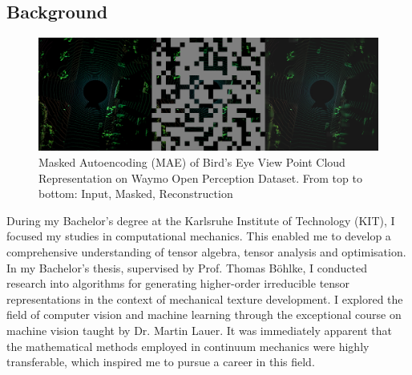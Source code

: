


\setlength{\columnsep}{15pt}%
\setlength{\intextsep}{0pt plus 0pt minus 0pt}


\setlength{\parindent}{\myindent}

    
    \subsection{\textbf{Background}} \begin{figure}
        \includegraphics[width=330pt, angle=270]{pic/Hiera-Waymo.png}
        \mainfont\fontsize{9pt}{9pt}\selectfont\caption{ \mainfont\fontsize{9pt}{9pt}\selectfont Masked Autoencoding 
        (MAE) of Bird's Eye View Point Cloud Representation on Waymo Open Perception Dataset. From top to bottom: Input, Masked, Reconstruction}
        \label{fig:mae_img}
        \end{figure}
    
    During my Bachelor's degree at the Karlsruhe Institute of Technology (KIT), I focused my studies in computational mechanics. This enabled me to develop a comprehensive understanding of tensor algebra, tensor analysis and optimisation. In my Bachelor's thesis, supervised by Prof. Thomas Böhlke, I conducted research into algorithms for generating higher-order irreducible tensor representations in the context of mechanical texture development. I explored the field of computer vision and machine learning through the exceptional course on machine vision taught by Dr. Martin Lauer. It was immediately apparent that the mathematical methods employed in continuum mechanics were highly transferable, which inspired me to pursue a career in this field.

